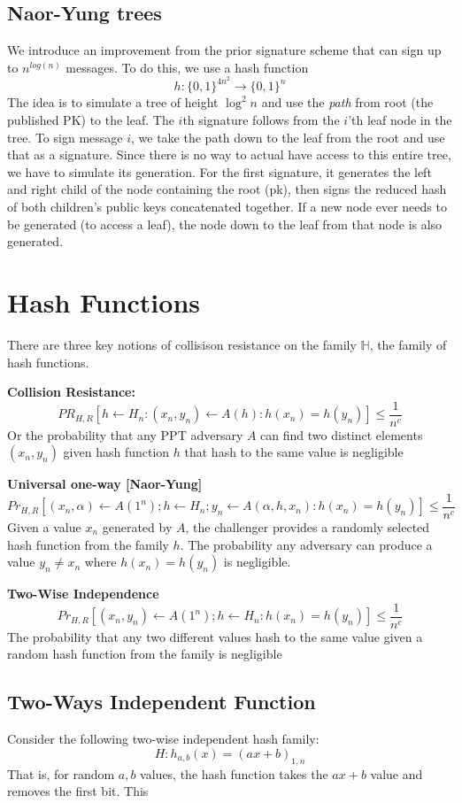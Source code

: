 \documentclass[11pt]{article}
\begin{document}
\subsection{Naor-Yung trees}
We introduce an improvement from the prior signature scheme that can sign up to $n^{log(n)}$ messages. To do this, we use a hash function $$h: \{0,1\}^{4n^2} \rightarrow \{0,1\}^n$$ The idea is to simulate a tree of height $\log^2n$ and use the \textit{path} from root (the published PK) to the leaf. The $i$th signature follows from the $i$'th leaf node in the tree. To sign message $i$, we take the path down to the leaf from the root and use that as a signature. Since there is no way to actual have access to this entire tree, we have to simulate its generation. For the first signature, it generates the left and right child of the node containing the root (pk), then signs the reduced hash of both children's public keys concatenated together. If a new node ever needs to be generated (to access a leaf), the node down to the leaf from that node is also generated.

\section{Hash Functions}
There are three key notions of collisison resistance on the family $\mathbb{H}$, the family of hash functions.
\vspace{1em}

\textbf{Collision Resistance:}$$PR_{H,R}[h \leftarrow H_n: (x_n,y_n) \leftarrow A(h): h(x_n) = h(y_n)] \leq \frac{1}{n^c}$$Or the probability that any PPT adversary $A$ can find two distinct elements $(x_n,y_n)$ given hash function $h$ that hash to the same value is negligible
\vspace{1em}

\textbf{Universal one-way [Naor-Yung]}$$Pr_{H,R}[(x_n,\alpha) \leftarrow A(1^n);h\leftarrow H_n;y_n \leftarrow A(\alpha,h,x_n): h(x_n)=h(y_n)]\leq \frac{1}{n^c}$$
Given a value $x_n$ generated by $A$, the challenger provides a randomly selected hash function from the family $h$. The probability any adversary can produce a value $y_n \neq x_n$ where $h(x_n) = h(y_n)$ is negligible.
\vspace{1em}

\textbf{Two-Wise Independence}
$$Pr_{H,R}[(x_n,y_n) \leftarrow A(1^n);h\leftarrow H_n: h(x_n) = h(y_n)] \leq \frac{1}{n^c}$$
The probability that any two different values hash to the same value given a random hash function from the family is negligible

\subsection{Two-Ways Independent Function}
Consider the following two-wise independent hash family:
$$H: h_{a,b}(x) = (ax + b)_{1,n}$$
That is, for random $a,b$ values, the hash function takes the $ax+b$ value and removes the first bit. This 
\end{document}

